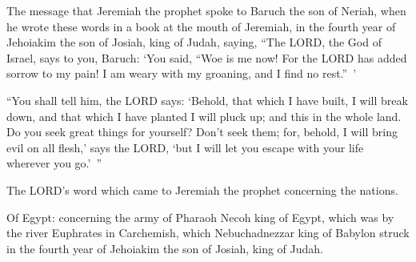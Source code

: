 \mychapter{} \myverse*{}The message that Jeremiah the prophet spoke to Baruch the son of Neriah, when he wrote these words in a book at the mouth of Jeremiah, in the fourth year of Jehoiakim the son of Josiah, king of Judah, saying, \myverse{}“The LORD, the God of Israel, says to you, Baruch: \myverse{}‘You said, “Woe is me now! For the LORD has added sorrow to my pain! I am weary with my groaning, and I find no rest.” ’


\myverse{}“You shall tell him, the LORD says: ‘Behold, that which I have built, I will break down, and that which I have planted I will pluck up; and this in the whole land. \myverse{}Do you seek great things for yourself? Don’t seek them; for, behold, I will bring evil on all flesh,’ says the LORD, ‘but I will let you escape with your life wherever you go.’ ”


\mychapter{} \myverse*{}The LORD’s word which came to Jeremiah the prophet concerning
the nations.

\quad \myverse{}Of Egypt: concerning the army of Pharaoh Necoh king of Egypt, which was by the river Euphrates in Carchemish, which Nebuchadnezzar king of Babylon struck in the fourth year of Jehoiakim the son of Josiah, king of Judah.

